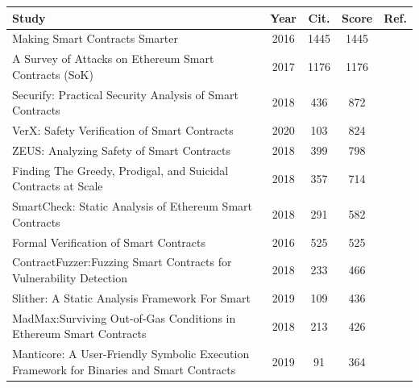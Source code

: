 \documentclass[a4paper,11pt]{article}
\begin{document}
\begin{table}[htpb]
        \begin{center}
            \small
            \begin{tabular}{||p{11cm}|c|c|c|c||}
                \hline
                Study & Year & Cit. & Score & Ref. \\ 
                \hline
                \hline
                Making Smart Contracts Smarter & 2016  & 1445 & 1445 & \cite{luu2016making} \\
                \hline
                A Survey of Attacks on Ethereum Smart Contracts (SoK) & 2017  & 1176 & 1176 & \cite{atzei2017survey} \\
                \hline
                Securify: Practical Security Analysis of Smart Contracts & 2018  & 436 & 872 & \cite{tsankov2018securify} \\
                \hline
                VerX: Safety Verification of Smart Contracts & 2020  & 103 & 824 & \cite{permenev2020verx} \\
                \hline
                ZEUS: Analyzing Safety of Smart Contracts  & 2018  & 399 & 798 & \cite{kalra2018zeus} \\
                \hline
                Finding The Greedy, Prodigal, and Suicidal Contracts at Scale & 2018  & 357 & 714 & \cite{liu2018reguard} \\
                \hline
                SmartCheck: Static Analysis of Ethereum Smart Contracts & 2018  & 291 & 582 & \cite{tikhomirov2018smartcheck} \\
                \hline
                Formal Verification of Smart Contracts & 2016  & 525 & 525 & \cite{bhargavan2016formal} \\
                \hline
                ContractFuzzer:Fuzzing Smart Contracts for Vulnerability Detection & 2018  & 233 & 466 & \cite{jiang2018contractfuzzer} \\
                \hline
                Slither: A Static Analysis Framework For Smart   & 2019  & 109 & 436 & \cite{feist2019slither} \\
                \hline
                MadMax:Surviving Out-of-Gas Conditions in Ethereum Smart Contracts & 2018  & 213 & 426 & \cite{grech2018madmax} \\
                \hline
                Manticore: A User-Friendly Symbolic Execution Framework for Binaries and Smart Contracts  & 2019  & 91 & 364 & \cite{mossberg2019manticore} \\
                \hline

\end{tabular}
\end{center}
\end{table}
\end{document}

